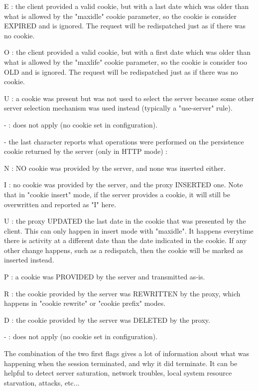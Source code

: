         E : the client provided a valid cookie, but with a last date which was
            older than what is allowed by the "maxidle" cookie parameter, so
            the cookie is consider EXPIRED and is ignored. The request will be
            redispatched just as if there was no cookie.

        O : the client provided a valid cookie, but with a first date which was
            older than what is allowed by the "maxlife" cookie parameter, so
            the cookie is consider too OLD and is ignored. The request will be
            redispatched just as if there was no cookie.

        U : a cookie was present but was not used to select the server because
            some other server selection mechanism was used instead (typically a
            "use-server" rule).

        - : does not apply (no cookie set in configuration).

  - the last character reports what operations were performed on the persistence
    cookie returned by the server (only in HTTP mode) :

        N : NO cookie was provided by the server, and none was inserted either.

        I : no cookie was provided by the server, and the proxy INSERTED one.
            Note that in "cookie insert" mode, if the server provides a cookie,
            it will still be overwritten and reported as "I" here.

        U : the proxy UPDATED the last date in the cookie that was presented by
            the client. This can only happen in insert mode with "maxidle". It
            happens everytime there is activity at a different date than the
            date indicated in the cookie. If any other change happens, such as
            a redispatch, then the cookie will be marked as inserted instead.

        P : a cookie was PROVIDED by the server and transmitted as-is.

        R : the cookie provided by the server was REWRITTEN by the proxy, which
            happens in "cookie rewrite" or "cookie prefix" modes.

        D : the cookie provided by the server was DELETED by the proxy.

        - : does not apply (no cookie set in configuration).

The combination of the two first flags gives a lot of information about what
was happening when the session terminated, and why it did terminate. It can be
helpful to detect server saturation, network troubles, local system resource
starvation, attacks, etc...

